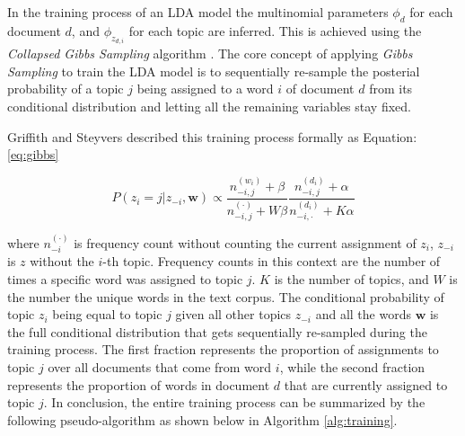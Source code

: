             In the training process of an LDA model the multinomial parameters $\phi_d$ for each document $d$, and $\phi_{z_{d,i}}$ for each topic are inferred. This is achieved using the \emph{Collapsed Gibbs Sampling} algorithm \cite{griffiths2004finding}. The core concept of applying \emph{Gibbs Sampling} to train the LDA model is to sequentially re-sample the posterial probability of a topic $j$ being assigned to a word $i$ of document $d$ from its conditional distribution and letting all the remaining variables stay fixed.
            
            Griffith and Steyvers \cite{griffiths2004finding} described this training process formally as Equation: \ref{eq:gibbs}
            
            \begin{equation} \label{eq:gibbs}
                P(z_i = j| \textbf{$z_{-i}$}, \textbf{w}) \propto \frac{n_{-i,j}^{(w_i)} + \beta}{n_{-i,j}^{(\cdot)} + W \beta} \frac{n_{-i,j}^{(d_i)} + \alpha}{n_{-i,\cdot}^{(d_i)} + K \alpha}
            \end{equation}
            
            where $n_{-i}^{(\cdot)}$ is frequency count without counting the current assignment of $z_i$, $z_{-i}$ is $z$ without the $i$-th topic. Frequency counts in this context are the number of times a specific word was assigned to topic $j$. $K$ is the number of topics, and $W$ is the number the unique words in the text corpus. The conditional probability of topic $z_i$ being equal to topic $j$ given all other topics $z_{-i}$ and all the words $\textbf{w}$ is the full conditional distribution that gets sequentially re-sampled during the training process. The first fraction represents the proportion of assignments to topic $j$ over all documents that come from word $i$, while the second fraction represents the proportion of words in document $d$ that are currently assigned to topic $j$. In conclusion, the entire training process can be summarized by the following pseudo-algorithm as shown below in Algorithm \ref{alg:training}.
            
            
            
                    
